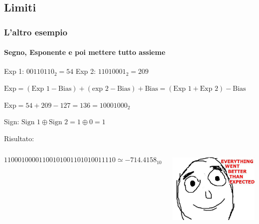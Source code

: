 \documentclass{beamer}
\begin{document}
  \subsection{Limiti}
	\begin{frame}
    \frametitle{L'altro esempio}
    \framesubtitle{Segno, Esponente e poi mettere tutto assieme}
   		Exp 1: $00110110_{2} = 54$
   		Exp 2: $11010001_{2} = 209$
   		
   		$\text{Exp} = (\text{Exp 1} - \text{Bias}) + (\text{exp 2} - \text{Bias}) + \text{Bias} = (\text{Exp 1} + \text{Exp 2}) - \text{Bias}$
   		
   		$\text{Exp} = 54 + 209 - 127 = 136 = 10001000_{2}$
   		
   		\vspace{2em}
   		\pause
   		
   		Sign: $\text{Sign 1} \oplus \text{Sign 2} = 1 \oplus 0 = 1$
   		
   		\vspace{2em}
   		\pause
   		
   		Risultato:
   		\begin{columns}
   			$$11000100001100101001101010011110 \simeq -714.4158_{10}$$
   			\pause
   			\begin{center}
		    		\includegraphics[width=.9\textwidth]{IMGs/Everything.jpg}
		    \end{center}
			\end{columns}  
  \end{frame}
\end{document}
